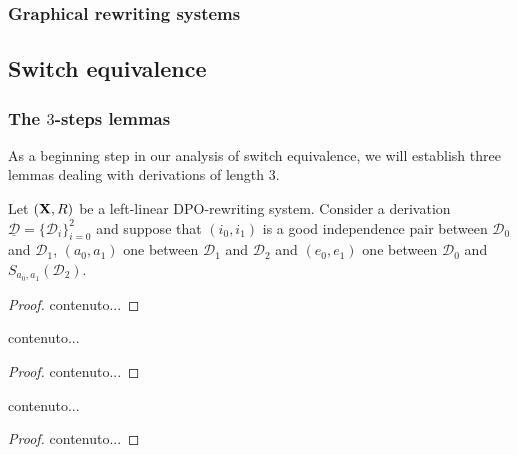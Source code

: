 \documentclass[a4paper,UKenglish,cleveref,pdftex, thm-restate,numberwithinsect]{lipics}
\def\R{\mathsf{R}}
\def\X{\textbf {\textup{X}}}
\newcommand{\dder}[1]{\mathscr{#1}}
\newcommand{\der}[1]{\underline{\dder{#1}}}
\begin{document}
\begin{example}\label{ex:contro}
\end{example}



\subsubsection{Graphical rewriting systems}\label{subsubsec:graphical}


\subsection{Switch equivalence}

\subsubsection{The $3$-steps lemmas} 

As a beginning step in our analysis of switch equivalence, we will establish three lemmas  dealing with derivations of length $3$. 


\begin{lemma}\label{lem:primo}
Let $(\X,\R)$ be a left-linear DPO-rewriting system. Consider a derivation $\der{D}=\{\dder{D}_i\}_{i=0}^2$ and suppose that $(i_0,i_1)$ is a good independence pair between $\dder{D}_0$ and $\dder{D}_1$, $(a_0,a_1)$ one between $\dder{D}_1$ and $\dder{D}_2$ and $(e_0, e_1)$ one between $\dder{D}_0$ and $S_{a_0,a_1}(\dder{D}_2)$.
\end{lemma}
\begin{proof}
	contenuto...
\end{proof}


\begin{lemma}\label{lem:secondo}
	contenuto...
\end{lemma}
\begin{proof}
	contenuto...
\end{proof}



\begin{lemma}\label{lem:terzo}
	contenuto...
\end{lemma}
\begin{proof}
	contenuto...
\end{proof}
\end{document}
